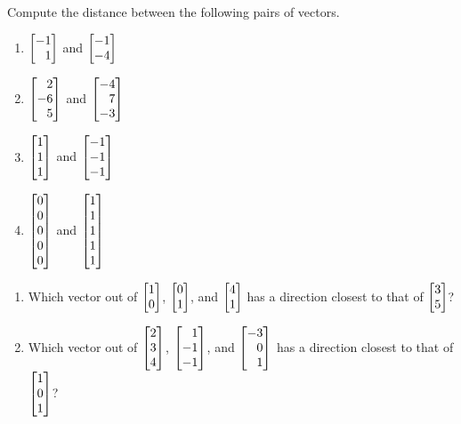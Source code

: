 \begin{exercises}
\begin{problist}
\begin{solution}
		\end{solution}
		
		\prob Compute the distance between the following pairs of vectors.
		\begin{enumerate}
			\item $\mat{-1\\1}$ and $\mat{-1\\-4}$
			\item $\mat{2\\-6\\5}$ and $\mat{-4\\7\\-3}$
			\item $\mat{1\\1\\1}$ and $\mat{-1\\-1\\-1}$
			\item $\mat{0\\0\\0\\0\\0}$ and $\mat{1\\1\\1\\1\\1}$
		\end{enumerate}
		\begin{solution}
		
		\end{solution}
		
		\prob
		\begin{enumerate}
			\item Which vector out of $\mat{1\\0}$, $\mat{0\\1}$, and $\mat{4\\1}$
			has a direction closest to that of $\mat{3\\5}$?
			\item Which vector out of $\mat{2\\3\\4}$, $\mat{1\\-1\\-1}$, and $\mat{-3\\0\\1}$
			has a direction closest to that of $\mat{1\\0\\1}$?
		\end{enumerate}
		\begin{solution}
		

\end{solution}
\end{problist}
\end{exercises}

